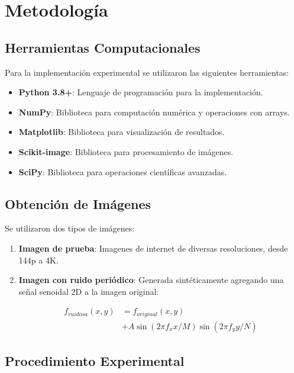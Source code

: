 \documentclass[conference]{IEEEtran}
\begin{document}
\section{Metodología}

\subsection{Herramientas Computacionales}

Para la implementación experimental se utilizaron las siguientes herramientas:

\begin{itemize}
    \item \textbf{Python 3.8+}: Lenguaje de programación para la implementación.
    \item \textbf{NumPy}: Biblioteca para computación numérica y operaciones con arrays.
    \item \textbf{Matplotlib}: Biblioteca para visualización de resultados.
    \item \textbf{Scikit-image}: Biblioteca para procesamiento de imágenes.
    \item \textbf{SciPy}: Biblioteca para operaciones científicas avanzadas.
\end{itemize}

\subsection{Obtención de Imágenes}

Se utilizaron dos tipos de imágenes:
\begin{enumerate}
    \item \textbf{Imagen de prueba}: Imagenes de internet de diversas resoluciones, desde 144p a 4K.
    \item \textbf{Imagen con ruido periódico}: Generada sintéticamente agregando una señal senoidal 2D a la imagen original:
    
    \begin{equation}
\begin{split}
f_{ruidosa}(x,y) &= f_{original}(x,y) \\
                 &+ A \sin(2\pi f_x x/M) \sin(2\pi f_y y/N)
\end{split}
\label{eq:ruido_periodico}
\end{equation}
\end{enumerate}

\subsection{Procedimiento Experimental}
\end{document}
